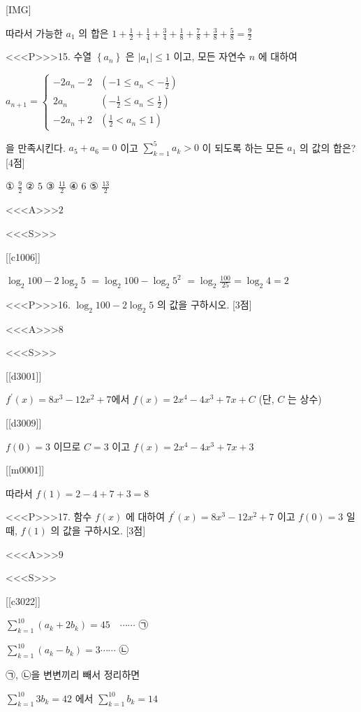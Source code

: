\documentclass{oblivoir}
\begin{document}
[IMG]

따라서 가능한 $a_{1}$ 의 합은 $1+\frac{1}{2}+\frac{1}{4}+\frac{3}{4}+\frac{1}{8}+\frac{7}{8}+\frac{3}{8}+\frac{5}{8}=\frac{9}{2}$


<<<P>>>15. 수열 $\left\{a_{n}\right\}$ 은 $\left|a_{1}\right| \leq 1$ 이고, 모든 자연수 $n$ 에 대하여

$a_{n+1}=\left\{\begin{array}{cl}
-2 a_{n}-2 & \left(-1 \leq a_{n}<-\frac{1}{2}\right)\\
2 a_{n} & \left(-\frac{1}{2} \leq a_{n} \leq \frac{1}{2}\right)\\
-2 a_{n}+2 & \left(\frac{1}{2}<a_{n} \leq 1\right)
\end{array}\right.$

을 만족시킨다. $a_{5}+a_{6}=0$ 이고 $\sum_{k=1}^{5} a_{k}>0$ 이 되도록 하는 모든 $a_{1}$ 의 값의 합은? [4점]

① $\frac{9}{2}$
② $5$
③ $\frac{11}{2}$
④ $6$
⑤ $\frac{13}{2}$

<<<A>>>$2$

<<<S>>>

[[c1006]]

$ \log _{2} 100-2 \log _{2} 5$ $=\log _{2} 100-\log _{2} 5^{2}$
$=\log _{2} \frac{100}{25}=\log _{2} 4=2 $


<<<P>>>16. $\log _{2} 100-2 \log _{2} 5$ 의 값을 구하시오. [3점]

<<<A>>>$8$

<<<S>>>

[[d3001]]

$f^{\prime}(x)=8 x^{3}-12 x^{2}+7$에서
$f(x)=2 x^{4}-4 x^{3}+7 x+C $ (단, $C$ 는 상수)

[[d3009]]

$ f(0)=3 $ 이므로 $C=3 $ 이고 $ f(x)=2 x^{4}-4 x^{3}+7 x+3$ 

[[m0001]]

따라서 $f(1)=2-4+7+3=8$


<<<P>>>17. 함수 $f(x)$ 에 대하여 $f^{\prime}(x)=8 x^{3}-12 x^{2}+7$ 이고 $f(0)=3$ 일 때, $f(1)$ 의 값을 구하시오. [3점]

<<<A>>>$9$

<<<S>>>

[[c3022]]

$ \sum_{k=1}^{10}\left(a_{k}+2 b_{k}\right)=45 \quad \cdots \cdots$ ㉠

$\sum_{k=1}^{10}\left(a_{k}-b_{k}\right)=3 \cdots \cdots$ ㉡

㉠, ㉡을 변변끼리 빼서 정리하면

$\sum_{k=1}^{10} 3 b_{k}=42$ 에서 $\sum_{k=1}^{10} b_{k}=14$
\end{document}
